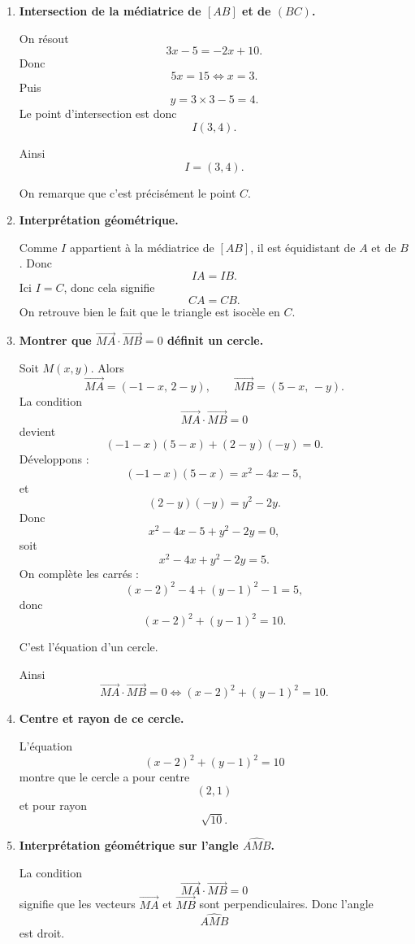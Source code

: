 \documentclass[11pt,a4paper]{article}
\newcommand{\vv}[1]{\overrightarrow{#1}}
\begin{document}
\begin{enumerate}[label=\textbf{\arabic*.}]
    \item \textbf{Intersection de la médiatrice de \([AB]\) et de \((BC)\).}

    On résout
    \[
    3x-5=-2x+10.
    \]
    Donc
    \[
    5x=15 \iff x=3.
    \]
    Puis
    \[
    y=3\times 3-5=4.
    \]
    Le point d'intersection est donc
    \[
    I(3,4).
    \]

    Ainsi
    \[
    \boxed{I=(3,4).}
    \]

    On remarque que c'est précisément le point \(C\).

    \item \textbf{Interprétation géométrique.}

    Comme \(I\) appartient à la médiatrice de \([AB]\), il est équidistant de \(A\) et de \(B\). Donc
    \[
    IA=IB.
    \]
    Ici \(I=C\), donc cela signifie
    \[
    CA=CB.
    \]
    On retrouve bien le fait que le triangle est isocèle en \(C\).

    \item \textbf{Montrer que \(\vv{MA}\cdot\vv{MB}=0\) définit un cercle.}

    Soit \(M(x,y)\). Alors
    \[
    \vv{MA}=(-1-x,\,2-y),\qquad \vv{MB}=(5-x,\,-y).
    \]
    La condition
    \[
    \vv{MA}\cdot\vv{MB}=0
    \]
    devient
    \[
    (-1-x)(5-x)+(2-y)(-y)=0.
    \]
    Développons :
    \[
    (-1-x)(5-x)=x^2-4x-5,
    \]
    et
    \[
    (2-y)(-y)=y^2-2y.
    \]
    Donc
    \[
    x^2-4x-5+y^2-2y=0,
    \]
    soit
    \[
    x^2-4x+y^2-2y=5.
    \]
    On complète les carrés :
    \[
    (x-2)^2-4+(y-1)^2-1=5,
    \]
    donc
    \[
    (x-2)^2+(y-1)^2=10.
    \]

    C'est l'équation d'un cercle.

    Ainsi
    \[
    \boxed{\vv{MA}\cdot\vv{MB}=0 \iff (x-2)^2+(y-1)^2=10.}
    \]

    \item \textbf{Centre et rayon de ce cercle.}

    L'équation
    \[
    (x-2)^2+(y-1)^2=10
    \]
    montre que le cercle a pour centre
    \[
    \boxed{(2,1)}
    \]
    et pour rayon
    \[
    \boxed{\sqrt{10}.}
    \]

    \item \textbf{Interprétation géométrique sur l'angle \(\widehat{AMB}\).}

    La condition
    \[
    \vv{MA}\cdot\vv{MB}=0
    \]
    signifie que les vecteurs \(\vv{MA}\) et \(\vv{MB}\) sont perpendiculaires. Donc l'angle
    \[
    \widehat{AMB}
    \]
    est droit.


\end{enumerate}
\end{document}
